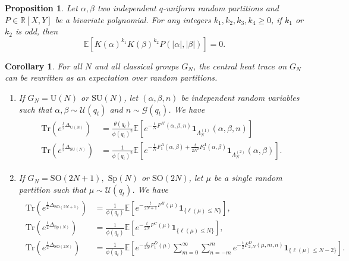 \documentclass[10pt,a4paper]{amsart}
\newtheorem{proposition}{Proposition}
\newtheorem{corollary}{Corollary}
\newcommand\E{\mathbb{E}}
\newcommand\Gfr{\mathscr{G}}
\newcommand\R{\mathbb{R}}
\newcommand\SO{{\mathrm{SO}}}
\newcommand\SU{{\mathrm{SU}}}
\newcommand\Sp{{\mathrm{Sp}}}
\newcommand\Tr{\mathrm{Tr}}
\newcommand\U{{\mathrm U}}
\newcommand\Ufr{\mathscr{U}}
\begin{document}
\begin{proposition}\label{prop:symmetry_partitions}
Let $\alpha,\beta$ two independent $q$-uniform random partitions and $P\in\R[X,Y]$ be a bivariate polynomial. For any integers $k_1,k_2,k_3,k_4\geq 0$, if $k_1$ or $k_2$ is odd, then
\begin{equation}
\E[K(\alpha)^{k_1}K(\beta)^{k_2}P(\vert\alpha\vert,\vert\beta\vert)]=0.
\end{equation}
\end{proposition}

\begin{corollary}\label{cor:heat_trace_expectation}
For all $N$ and all classical groups $G_N$, the central heat trace on $G_N$ can be rewritten as an expectation over random partitions.
\begin{enumerate}
\item If $G_N=\U(N)$ or $\SU(N)$, let $(\alpha,\beta,n)$ be independent random variables such that $\alpha,\beta\sim\Ufr(q_t)$ and $n\sim\Gfr(q_t)$. We have
\begin{align}
\begin{split}
\Tr(e^{\frac{t}{2}\Delta_{\U(N)}}) & =\frac{\theta(q_t)}{\phi(q_t)^2}\E\left[e^{-\frac{t}{N}F^{A'}(\alpha,\beta,n)}\mathbf{1}_{\Lambda_N^{(1)}}(\alpha,\beta,n)\right]\\
\Tr(e^{\frac{t}{2}\Delta_{\SU(N)}}) & = \frac{1}{\phi(q_t)^2}\E\left[e^{-\frac{t}{N}F_1^A(\alpha,\beta)+\frac{t}{2N^2}F_2^A(\alpha,\beta)}\mathbf{1}_{\Lambda_N^{(2)}}(\alpha,\beta)\right].
\end{split}
\end{align}
\item If $G_N=\SO(2N+1),$ $\Sp(N)$ or $\SO(2N)$, let $\mu$ be a single random partition such that $\mu\sim\Ufr(q_t)$. We have
\begin{align}
\begin{split}
\Tr\left(e^{\frac{t}{2}\Delta_{\SO(2N+1)}}\right) & = \frac{1}{\phi(q_t)}\E\left[e^{-\frac{t}{2N+1}F^B(\mu)}\mathbf{1}_{\{\ell(\mu)\leq N\}}\right],\\
\Tr\left(e^{\frac{t}{2}\Delta_{\Sp(N)}}\right) & = \frac{1}{\phi(q_t)}\E\left[e^{-\frac{t}{2N}F^C(\mu)}\mathbf{1}_{\{\ell(\mu)\leq N\}}\right],\\
\Tr(e^{\frac{t}{2}\Delta_{\SO(2N)}}) & =\frac{1}{\phi(q_t)}\E\left[e^{-\frac{t}{2N}F_1^D(\mu)}\sum_{m=0}^\infty\sum_{n=-m}^m e^{-\frac{t}{2}F_{2,N}^D(\mu,m,n)}\mathbf{1}_{\{\ell(\mu)\leq N-2\}}\right].
\end{split}
\end{align}
\end{enumerate}
\end{corollary}
\end{document}
